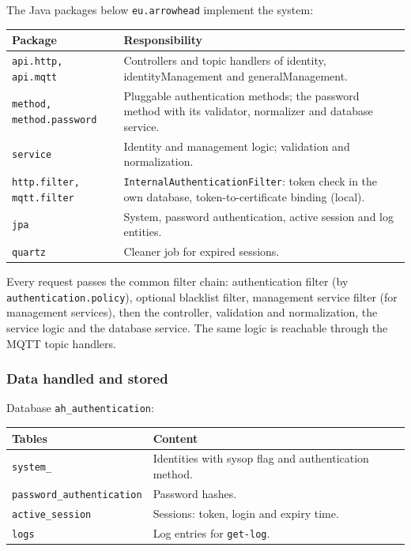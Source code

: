\documentclass[a4paper]{arrowhead}
\begin{document}
The Java packages below \texttt{eu.arrowhead} implement the system:

\noindent\begin{longtable}{| p{5.6cm} | p{9.6cm} |} \hline
\rowcolor{gray!33} Package & Responsibility \\ \hline \endhead
\texttt{api.\allowbreak{}http,\allowbreak{} api.\allowbreak{}mqtt} & Controllers and topic handlers of identity, identity\allowbreak{}Management and generalManagement. \\ \hline
\texttt{method,\allowbreak{} method.\allowbreak{}password} & Pluggable authentication methods; the password method with its validator, normalizer and database service. \\ \hline
\texttt{service} & Identity and management logic; validation and normalization. \\ \hline
\texttt{http.\allowbreak{}filter,\allowbreak{} mqtt.\allowbreak{}filter} & \texttt{Internal\allowbreak{}Authentication\allowbreak{}Filter}: token check in the own database, token-to-certificate binding (local). \\ \hline
\texttt{jpa} & System, password authentication, active session and log entities. \\ \hline
\texttt{quartz} & Cleaner job for expired sessions. \\ \hline
\end{longtable}

Every request passes the common filter chain: authentication filter (by \texttt{authentication.policy}), optional blacklist filter, management service filter (for management services), then the controller, validation and normalization, the service logic and the database service. The same logic is reachable through the MQTT topic handlers.

\subsubsection{Data handled and stored}

Database \texttt{ah\_authentication}:

\noindent\begin{longtable}{| p{6.4cm} | p{8.8cm} |} \hline
\rowcolor{gray!33} Tables & Content \\ \hline \endhead
\texttt{system\_\allowbreak{}} & Identities with sysop flag and authentication method. \\ \hline
\texttt{password\_\allowbreak{}authentication} & Password hashes. \\ \hline
\texttt{active\_\allowbreak{}session} & Sessions: token, login and expiry time. \\ \hline
\texttt{logs} & Log entries for \texttt{get-\allowbreak{}log}. \\ \hline
\end{longtable}
\end{document}
